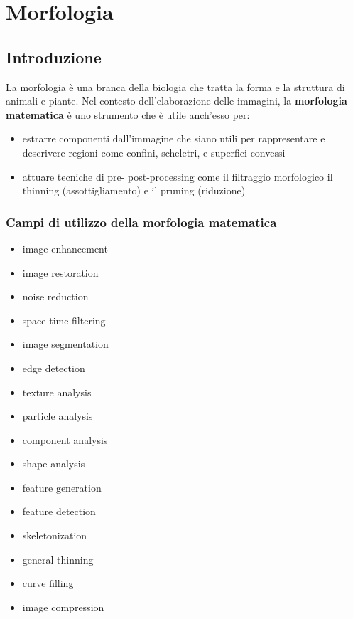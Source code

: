 \chapter{Morfologia}

\section{Introduzione}
La morfologia è una branca della biologia che tratta la forma e la struttura di animali e piante. Nel contesto dell'elaborazione delle immagini, la \textbf{morfologia matematica} è uno strumento che è utile anch'esso per:

\begin{itemize}
	\item estrarre componenti dall'immagine che siano utili per rappresentare e descrivere regioni come confini, scheletri, e superfici convessi
	
	\item attuare tecniche di pre- post-processing come il filtraggio morfologico il thinning (assottigliamento) e il pruning (riduzione)
\end{itemize}

\subsection{Campi di utilizzo della morfologia matematica}
\begin{itemize}
	\item image enhancement
	\item image restoration
	\item noise reduction
	\item space-time filtering
	\item image segmentation
	\item edge detection
	\item texture analysis
	\item particle analysis
	\item component analysis
	\item shape analysis
	\item feature generation
	\item feature detection
	\item skeletonization
	\item general thinning
	\item curve filling
	\item image compression
\end{itemize}

